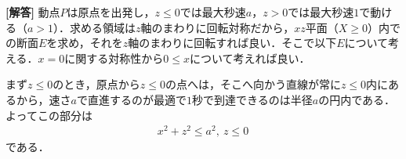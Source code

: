 \documentclass[../../main.tex]{subfiles}
\begin{document}
\begin{oframed}
  
\end{oframed}

{\bf [解答]}
動点$P$は原点を出発し，$z\le0$では最大秒速$a$，$z>0$では最大秒速$1$で動ける（$a>1$）．求める領域は$z$軸のまわりに回転対称だから，$xz$平面（$X\ge0$）内での断面$E$を求め，それを$z$軸のまわりに回転すれば良い．そこで以下$E$について考える．$x=0$に関する対称性から$0 \le x$について考えれば良い．

まず$z \le 0$のとき，原点から$z\le0$の点へは，そこへ向かう直線が常に$z\le0$内にあるから，速さ$a$で直進するのが最適で$1$秒で到達できるのは半径$a$の円内である．よってこの部分は
\begin{align}
  x^2+z^2 \le a^2,\ z \le 0 \label{eq:1}
\end{align}
である．
\end{document}
